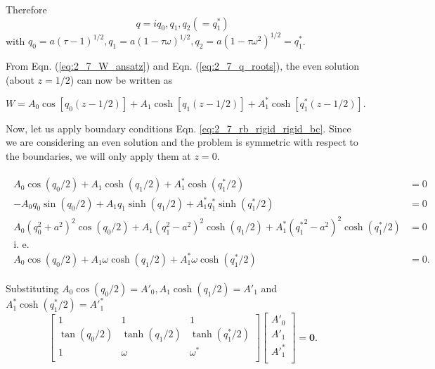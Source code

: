 Therefore
\begin{equation}\label{eq:2_7_q_roots}
 q = iq_{0}, q_{1}, q_{2} ( =  q^{*}_{1})
\end{equation}
with $q_{0} = a (\tau - 1)^{1/2}, q_{1} = a (1 - \tau \omega)^{1/2}, q_{2} = a (1 - \tau \omega^{2})^{1/2} = q^{*}_{1}$. 

From Eqn. (\ref{eq:2_7_W_ansatz}) and Eqn. (\ref{eq:2_7_q_roots}), the even solution (about $z = 1/2$) can now be written as

\begin{equation}\label{eq:2_7_even_soln}
\boxed{
 W = A_{0} \cos{[q_{0}(z-1/2)]} + A_{1} \cosh{[q_{1}(z-1/2)]} + A^{*}_{1} \cosh{[q^{*}_{1}(z-1/2)]}
 }.
\end{equation}

Now, let us apply boundary conditions Eqn. \ref{eq:2_7_rb_rigid_rigid_bc}. Since we are considering an even solution and the problem is symmetric with respect to the boundaries, we will only apply them at $z= 0$.  

\begin{align}\label{eq:2_7_apply_bc_naive}
 \begin{split}
  A_{0} \cos{(q_{0}/2)} + A_{1}\cosh{(q_{1}/2)} + A^{*}_{1}\cosh{(q^{*}_{1}/2)} & = 0 \\
  -A_{0}q_{0}\sin{(q_{0}/2)} + A_{1}q_{1}\sinh{(q_{1}/2)} + A^{*}_{1}q^{*}_{1}\sinh{(q^{*}_{1}/2)} & = 0\\
  A_{0}(q_{0}^{2} + a^{2})^{2}\cos{(q_{0}/2)} + A_{1}(q_{1}^{2} - a^{2})^{2}\cosh{(q_{1}/2)} + A^{*}_{1}({q^{*}_{1}}^{2} - a^{2})^{2}\cosh{(q^{*}_{1}/2)}  & = 0 \\
  \textrm{i. e.}\\
  A_{0}\cos{(q_{0}/2)} + A_{1}\omega \cosh{(q_{1}/2)} + A^{*}_{1}\omega \cosh{(q^{*}_{1}/2)} & = 0.
 \end{split}
\end{align}

Substituting $A_{0} \cos{(q_{0}/2)} = A'_{0}, A_{1}\cosh{(q_{1}/2)} = A'_{1}$ and $A^{*}_{1}\cosh{(q^{*}_{1}/2)} = A'^{*}_{1}$
%
\begin{equation}\label{eq:2_7_matrix_form}
\begin{bmatrix}
1   &   1   &   1 \\
\tan({q_{0}/2})   &   \tanh({q_{1}/2})   &   \tanh({q^{*}_{1}/2})\\
1   &   \omega &   \omega^{*}\\
\end{bmatrix}
\begin{bmatrix}
 A'_{0}\\
 A'_{1}\\
 A'^{*}_{1}\\
\end{bmatrix} 
= \boldsymbol{0}.
\end{equation}

